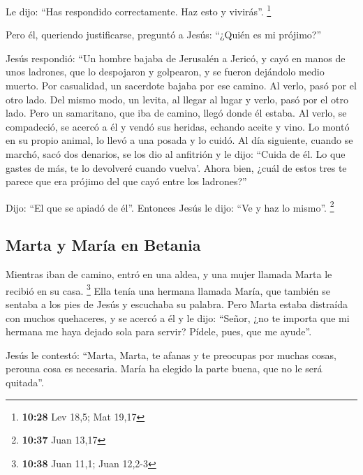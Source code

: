 \begin{paracol}{2}
 Le dijo: ``Has respondido correctamente. Haz esto y
vivirás''. \footnote{\textbf{10:28} Lev 18,5; Mat 19,17}

 Pero él, queriendo justificarse, preguntó a Jesús:
``¿Quién es mi prójimo?''

 Jesús respondió: ``Un hombre bajaba de Jerusalén a
Jericó, y cayó en manos de unos ladrones, que lo despojaron y golpearon,
y se fueron dejándolo medio muerto.  Por casualidad, un
sacerdote bajaba por ese camino. Al verlo, pasó por el otro lado.
 Del mismo modo, un levita, al llegar al lugar y verlo,
pasó por el otro lado.  Pero un samaritano, que iba de
camino, llegó donde él estaba. Al verlo, se compadeció, 
se acercó a él y vendó sus heridas, echando aceite y vino. Lo montó en
su propio animal, lo llevó a una posada y lo cuidó.  Al
día siguiente, cuando se marchó, sacó dos denarios, se los dio al
anfitrión y le dijo: ``Cuida de él. Lo que gastes de más, te lo
devolveré cuando vuelva'.  Ahora bien, ¿cuál de estos
tres te parece que era prójimo del que cayó entre los ladrones?''

 Dijo: ``El que se apiadó de él''. Entonces Jesús le
dijo: ``Ve y haz lo mismo''. \footnote{\textbf{10:37} Juan 13,17}

\hypertarget{marta-y-maruxeda-en-betania}{%
\subsection{Marta y María en
Betania}\label{marta-y-maruxeda-en-betania}}

 Mientras iban de camino, entró en una aldea, y una mujer
llamada Marta le recibió en su casa. \footnote{\textbf{10:38} Juan 11,1;
  Juan 12,2-3}  Ella tenía una hermana llamada María, que
también se sentaba a los pies de Jesús y escuchaba su palabra.
 Pero Marta estaba distraída con muchos quehaceres, y se
acercó a él y le dijo: ``Señor, ¿no te importa que mi hermana me haya
dejado sola para servir? Pídele, pues, que me ayude''.

 Jesús le contestó: ``Marta, Marta, te afanas y te
preocupas por muchas cosas,  perouna cosa es necesaria.
María ha elegido la parte buena, que no le será quitada''.

\switchcolumn
\begin{otherlanguage}{english}


\end{otherlanguage}
\end{paracol}
